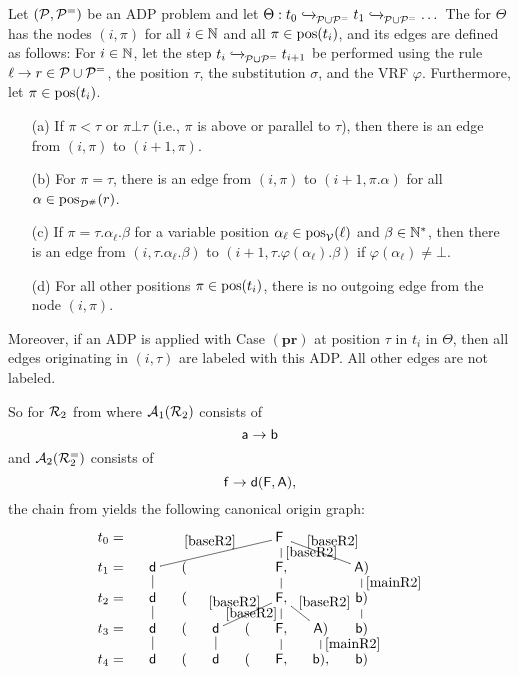 \begin{definition}\label{def:can_orig}
    Let $(\mathcal{P}, \mathcal{P}^=)$ be an ADP problem
    and let $\Theta: t_0 \mathrel{ \xhookrightarrow{{}_{\scriptstyle }} \!\!{}^{}_{\mathcal{P} \cup \mathcal{P}^{=}} } t_1 \mathrel{ \xhookrightarrow{{}_{\scriptstyle }} \!\!{}^{}_{\mathcal{P} \cup
      \mathcal{P}^{=}} } \ldots$\
    The  for $\Theta$
    has the nodes $(i,\pi)$  for all $i \in \mathbb{N}$ and all $\pi \in \mathrm{pos}(t_i)$,
    and its edges are defined as follows:
  For $i \in \mathbb{N}$,
    let
    the step  $t_i \mathrel{ \xhookrightarrow{{}_{\scriptstyle }} \!\!{}^{}_{\mathcal{P} \cup \mathcal{P}^{=}} } t_{i+1}$
 be performed using the rule
   $\ell \to r \in \mathcal{P} \cup \mathcal{P}^{=}$, the position $\tau$, the substitution $\sigma$, and the VRF $\varphi$.
    Furthermore, let $\pi \in \mathrm{pos}(t_i)$.
    \begin{itemize}
        \item[(a)] If $\pi < \tau$ or $\pi \bot \tau$ (i.e., $\pi$ is above or parallel to $\tau$),        
        then there is an edge from $(i,\pi)$ to $(i+1,\pi)$.
        \item[(b)] For $\pi=\tau$,
        there is an edge from $(i,\pi)$ to $(i+1,\pi.\alpha)$ for all $\alpha \in \mathrm{pos}_{\mathcal{D}^\#}(r)$.
        \item[(c)] If $\pi=\tau.\alpha_\ell.\beta$
        for a variable position $\alpha_\ell \in \mathrm{pos}_{\mathcal{V}}(\ell)$ and $\beta \in \mathbb{N}^*$, then
        there is an edge from $(i,\tau.\alpha_\ell.\beta)$ to 
        $(i+1,\tau.\varphi(\alpha_\ell).\beta)$ if $\varphi(\alpha_\ell) \neq \bot$.
        \item[(d)] For all other positions $\pi \in \mathrm{pos}(t_i)$, there is no outgoing edge from the node $(i, \pi)$.
    \end{itemize}
    Moreover, if an ADP is applied with Case $(\mathbf{pr})$ at position $\tau$ in
   $t_i$ in   $\Theta$, then all edges originating in $(i, \tau)$ are labeled with this ADP. All other
    edges are not labeled.
\end{definition}

    So for $\mathcal{R}_2$ from 
    where $\mathcal{A}_{1}(\mathcal{R}_2)$ consists of
    \begin{equation}\label{mainR2} 
        \mathsf{a} \to \mathsf{b}
    \end{equation}
    and $\mathcal{A}_{2}(\mathcal{R}_2^{=})$ consists of
    \begin{equation}\label{baseR2}
        \mathsf{f} \to \mathsf{d}(\mathsf{F},\mathsf{A}),
    \end{equation}
    the chain from  yields the following canonical origin graph:
    \[ \xymatrix @-1.5pc @C=1pc{
    t_0=&   & &   & &\tF\phantom{,}\ar@{-}[dllll]_{\eqref{baseR2}}\ar@{-}[d]^{\eqref{baseR2}}\ar@{-}[drr]^{\eqref{baseR2}}     & &  \\
    t_1=&\td\ar@{-}[d]&(&   & &\tF,\ar@{-}[d] &    &\tA\ar@{-}[d]^{\eqref{mainR2}})\\
    t_2= &\td\ar@{-}[d]&(&   & &\tF\ar@{-}[dll]_{\eqref{baseR2}}\ar@{-}[d]_{\eqref{baseR2}}\ar@{-}[dr]^{\eqref{baseR2}},    & &\tb\ar@{-}[d])\\
    t_3=&\td\ar@{-}[d]&(&\td\ar@{-}[d]&(&\tF,\ar@{-}[d],&\tA\ar@{-}[d]^{\eqref{mainR2}})&\tb\ar@{-}[d])\\
    t_4=&\td&(&\td&(&\tF,&\tb),&\tb)
    }
    \]

